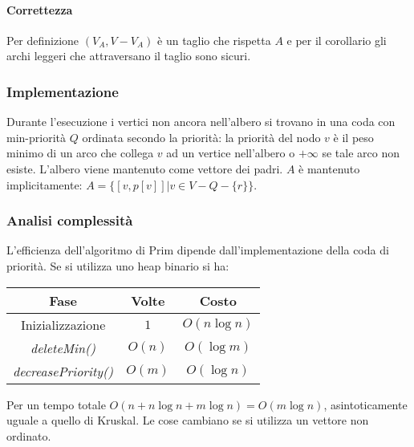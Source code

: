 \paragraph{Correttezza} Per definizione $(V_A, V - V_A)$ \`e un taglio che rispetta $A$ e per il corollario gli archi leggeri che attraversano il taglio sono sicuri. 
\subsubsection{Implementazione}
Durante l'esecuzione i vertici non ancora nell'albero si trovano in una coda con min-priorit\`a $Q$ ordinata secondo la priorit\`a: la priorit\`a del nodo $v$ \`e il peso minimo di un
arco che collega $v$ ad un vertice nell'albero o $+\infty$ se tale arco non esiste. L'albero viene mantenuto come vettore dei padri. $A$ \`e mantenuto implicitamente: $A=\{[v, p[v]]|v\in
V-Q-\{r\}\}$. \\

\subsubsection{Analisi complessit\`a}
L'efficienza dell'algoritmo di Prim dipende dall'implementazione della coda di priorit\`a. Se si utilizza uno heap binario si ha:
\begin{center}
\begin{tabular}{|c|c|c|}
	\hline
	\textbf{Fase} & \textbf{Volte} & \textbf{Costo} \\
	\hline
	Inizializzazione & $1$ & $O(n\log n)$ \\
	\hline
	\emph{deleteMin()} & $O(n)$ & $O(\log m)$ \\
	\hline
	\emph{decreasePriority()} & $O(m)$ & $O(\log n)$\\
	\hline
\end{tabular}
\end{center}
Per un tempo totale $O(n+n\log n+m\log n) = O(m\log n)$, asintoticamente uguale a quello di Kruskal. Le cose cambiano se si utilizza un vettore non ordinato.
